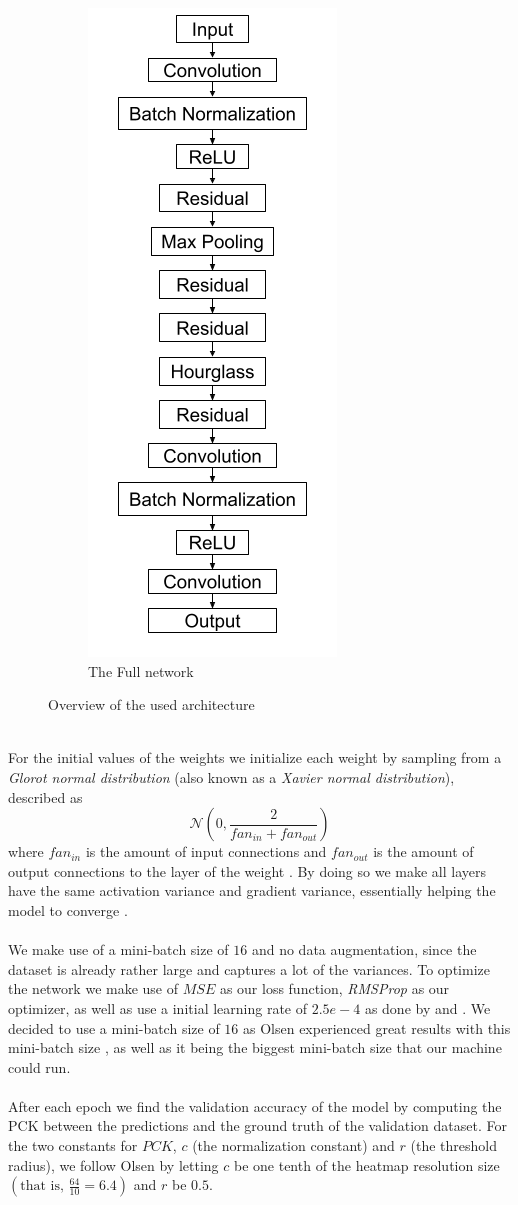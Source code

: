 \documentclass[./main.tex]{subfiles}
\begin{document}
\begin{figure}[p]
\begin{subfigure}{5 cm}
        \centering
        \includegraphics[width = 4 cm]{entities/SHG_drawing.png}
        \caption{The Full network}
    \end{subfigure}
    \caption{Overview of the used architecture}
    \label{fig:architecture}
\end{figure}
\\
For the initial values of the weights we initialize each weight by sampling from a \textit{Glorot normal distribution} (also known as a \textit{Xavier normal distribution}), described as
$$\mathcal{N} \left(0, \frac{2}{fan_{in} + fan_{out}} \right)$$
where $fan_{in}$ is the amount of input connections and $fan_{out}$ is the amount of output connections to the layer of the weight \cite{Xavier}. By doing so we make all layers have the same activation variance and gradient variance, essentially helping the model to converge \cite{DeepLearning}.
\\
\\
We make use of a mini-batch size of $16$ and no data augmentation, since the dataset is already rather large and captures a lot of the variances. To optimize the network we make use of $MSE$ as our loss function, \textit{RMSProp} as our optimizer, as well as use a initial learning rate of $2.5e-4$ as done by \cite{Newell} and \cite{Camilla}. We decided to use a mini-batch size of $16$ as Olsen experienced great results with this mini-batch size \cite{Camilla}, as well as it being the biggest mini-batch size that our machine could run.
\\
\\
After each epoch we find the validation accuracy of the model by computing the PCK between the predictions and the ground truth of the validation dataset.  For the two constants for $PCK$, $c$ (the normalization constant) and $r$ (the threshold radius), we follow Olsen \cite{Camilla} by letting $c$ be one tenth of the heatmap resolution size $\left(\text{that is, }\frac{64}{10} = 6.4 \right)$ and $r$ be $0.5$.
\end{document}
